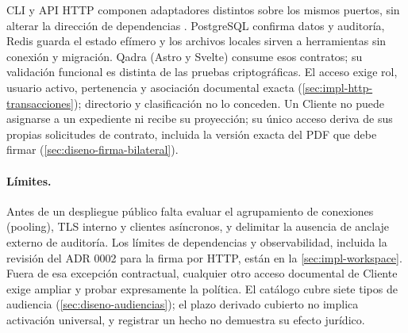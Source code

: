 CLI y API HTTP componen adaptadores distintos sobre los mismos puertos, sin alterar la dirección de dependencias \cite{ford2023}. PostgreSQL confirma datos y auditoría, Redis guarda el estado efímero y los archivos locales sirven a herramientas sin conexión y migración. Qadra (Astro y Svelte) consume esos contratos; su validación funcional es distinta de las pruebas criptográficas. El acceso exige rol, usuario activo, pertenencia y asociación documental exacta (\cref{sec:impl-http-transacciones}); directorio y clasificación no lo conceden. Un Cliente no puede asignarse a un expediente ni recibe su proyección; su único acceso deriva de sus propias solicitudes de contrato, incluida la versión exacta del PDF que debe firmar (\cref{sec:diseno-firma-bilateral}).

\paragraph{Límites.} Antes de un despliegue público falta evaluar el agrupamiento de conexiones (pooling), TLS interno y clientes asíncronos, y delimitar la ausencia de anclaje externo de auditoría. Los límites de dependencias y observabilidad, incluida la revisión del ADR 0002 para la firma por HTTP, están en la \cref{sec:impl-workspace}. Fuera de esa excepción contractual, cualquier otro acceso documental de Cliente exige ampliar y probar expresamente la política. El catálogo cubre siete tipos de audiencia (\cref{sec:diseno-audiencias}); el plazo derivado cubierto no implica activación universal, y registrar un hecho no demuestra su efecto jurídico.

